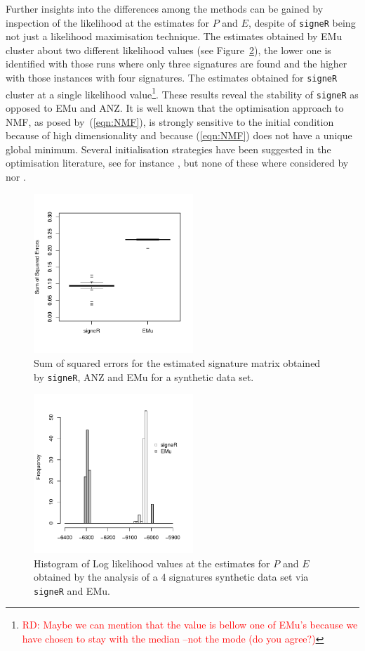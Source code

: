 \documentclass{bioinfo}
\begin{document}
Further insights into the differences among the methods can be gained
by inspection of the likelihood at the estimates for $P$ and $E$,
despite of \texttt{signeR} being not just a likelihood maximisation
technique. The estimates obtained by EMu cluster about two different
likelihood values (see Figure~\ref{fig:synth_LLh}), the lower one is
identified with those runs where only three signatures are found and
the higher with those instances with four signatures. The estimates
obtained for \texttt{signeR} cluster at a single likelihood
value\footnote{\textcolor{red}{RD: Maybe we can mention that the value
is bellow one of EMu's because we have chosen to stay with the median
--not the mode (do you agree?)}}. These results reveal the stability
of \texttt{signeR} as opposed to EMu and ANZ. It is well known that
the optimisation approach to NMF, as posed by~(\ref{eqn:NMF}), is
strongly sensitive to the initial condition because of high
dimensionality and because (\ref{eqn:NMF}) does not have a unique 
global minimum. Several initialisation strategies have been suggested
in  the optimisation literature, see for
instance \cite{LNACDarXiv, BG, BBLPP}, but none of these where
considered by \cite{FICMV} nor \cite{A}.

\begin{figure}  
 \centering
   \includegraphics[width=6cm]{figs/Simulation_signeR_vs_EMu_boxplot_SSE}
  \caption{\textrm{%
    Sum of squared errors for the estimated signature matrix obtained
    by \texttt{signeR}, ANZ and EMu for a synthetic data set. 
   }
  }
  \label{fig:synth_SSE}
\end{figure}
\begin{figure}  
 \centering
  \includegraphics[width=6cm]{figs/Simulation_signeR_vs_EMu_histogram_LLh_same_axis}
  \caption{\textrm{%
   Histogram of Log likelihood values at the estimates for $P$ and $E$
   obtained by the analysis of a 4 signatures synthetic data set via
   \texttt{signeR} and EMu.
   }
  }
  \label{fig:synth_LLh}
\end{figure}
\end{document}
